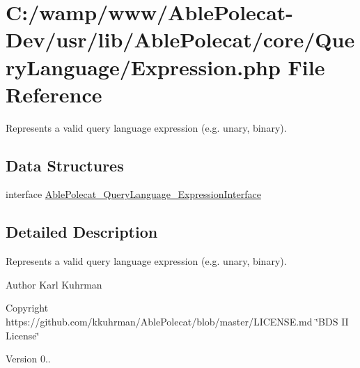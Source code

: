 \hypertarget{_expression_8php}{}\section{C\+:/wamp/www/\+Able\+Polecat-\/\+Dev/usr/lib/\+Able\+Polecat/core/\+Query\+Language/\+Expression.php File Reference}
\label{_expression_8php}


Represents a valid query language expression (e.\+g. unary, binary).  


\subsection*{Data Structures}
\begin{DoxyCompactItemize}
\item 
interface \hyperlink{interface_able_polecat___query_language___expression_interface}{Able\+Polecat\+\_\+\+Query\+Language\+\_\+\+Expression\+Interface}
\end{DoxyCompactItemize}


\subsection{Detailed Description}
Represents a valid query language expression (e.\+g. unary, binary). 

\begin{DoxyAuthor}{Author}
Karl Kuhrman 
\end{DoxyAuthor}
\begin{DoxyCopyright}{Copyright}
https\+://github.com/kkuhrman/\+Able\+Polecat/blob/master/\+L\+I\+C\+E\+N\+S\+E.\+md \char`\"{}\+B\+D\+S I\+I License\char`\"{} 
\end{DoxyCopyright}
\begin{DoxyVersion}{Version}
0.. 
\end{DoxyVersion}
